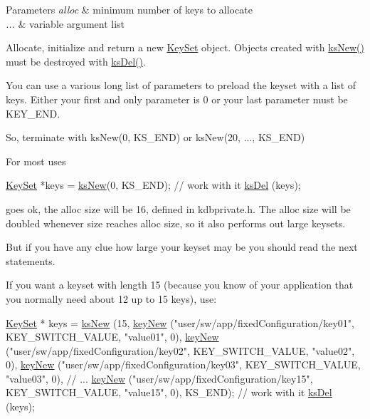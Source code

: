 \begin{DoxyParams}{Parameters}
{\em alloc} & minimum number of keys to allocate \\
\hline
{\em ...} & variable argument list\\
\hline
\end{DoxyParams}
Allocate, initialize and return a new \hyperlink{classkdb_1_1KeySet}{Key\+Set} object. Objects created with \hyperlink{group__keyset_ga671e1aaee3ae9dc13b4834a4ddbd2c3c}{ks\+New()} must be destroyed with \hyperlink{group__keyset_ga27e5c16473b02a422238c8d970db7ac8}{ks\+Del()}.

You can use a various long list of parameters to preload the keyset with a list of keys. Either your first and only parameter is 0 or your last parameter must be K\+E\+Y\+\_\+\+E\+N\+D.

So, terminate with ks\+New(0, K\+S\+\_\+\+E\+N\+D) or ks\+New(20, ..., K\+S\+\_\+\+E\+N\+D)

For most uses 
\begin{DoxyCode}
\hyperlink{classkdb_1_1KeySet_a4eac9850fa4f06c07a5306befc3e4377}{KeySet} *keys = \hyperlink{group__keyset_ga671e1aaee3ae9dc13b4834a4ddbd2c3c}{ksNew}(0, KS\_END);
\textcolor{comment}{// work with it}
\hyperlink{group__keyset_ga27e5c16473b02a422238c8d970db7ac8}{ksDel} (keys);
\end{DoxyCode}
 goes ok, the alloc size will be 16, defined in kdbprivate.\+h. The alloc size will be doubled whenever size reaches alloc size, so it also performs out large keysets.

But if you have any clue how large your keyset may be you should read the next statements.

If you want a keyset with length 15 (because you know of your application that you normally need about 12 up to 15 keys), use\+: 
\begin{DoxyCode}
\hyperlink{classkdb_1_1KeySet_a4eac9850fa4f06c07a5306befc3e4377}{KeySet} * keys = \hyperlink{group__keyset_ga671e1aaee3ae9dc13b4834a4ddbd2c3c}{ksNew} (15,
        \hyperlink{group__key_gad23c65b44bf48d773759e1f9a4d43b89}{keyNew} (\textcolor{stringliteral}{"user/sw/app/fixedConfiguration/key01"}, KEY\_SWITCH\_VALUE, \textcolor{stringliteral}{"value01"}, 0),
        \hyperlink{group__key_gad23c65b44bf48d773759e1f9a4d43b89}{keyNew} (\textcolor{stringliteral}{"user/sw/app/fixedConfiguration/key02"}, KEY\_SWITCH\_VALUE, \textcolor{stringliteral}{"value02"}, 0),
        \hyperlink{group__key_gad23c65b44bf48d773759e1f9a4d43b89}{keyNew} (\textcolor{stringliteral}{"user/sw/app/fixedConfiguration/key03"}, KEY\_SWITCH\_VALUE, \textcolor{stringliteral}{"value03"}, 0),
        \textcolor{comment}{// ...}
        \hyperlink{group__key_gad23c65b44bf48d773759e1f9a4d43b89}{keyNew} (\textcolor{stringliteral}{"user/sw/app/fixedConfiguration/key15"}, KEY\_SWITCH\_VALUE, \textcolor{stringliteral}{"value15"}, 0),
        KS\_END);
\textcolor{comment}{// work with it}
\hyperlink{group__keyset_ga27e5c16473b02a422238c8d970db7ac8}{ksDel} (keys);
\end{DoxyCode}


